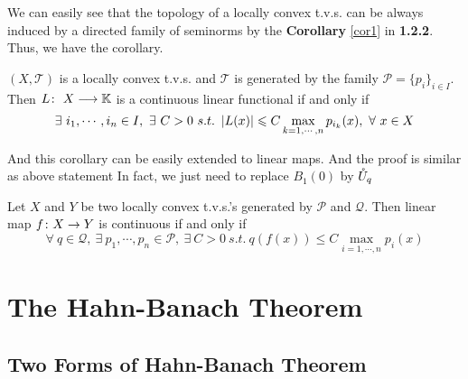 \documentclass[a4paper,11pt]{report}
\begin{document}
We can easily see that the topology of a locally convex t.v.s. can be always induced by a directed family of seminorms by the \textbf{Corollary} \ref{cor1} in \textbf{1.2.2}. Thus, we have the corollary.

\begin{cor} \label{cor3}
	$(X,\mathscr{T})$ is a locally convex t.v.s. and $\mathscr{T}$ is generated by the family $\mathscr{P} = \{p_i\}_{i \in I}$. Then $L \colon ~ X \longrightarrow \mathbb{K}$ is a continuous linear functional if and only if 
	\begin{equation*}
		\exists ~ i_1,\cdots,i_n \in I,~ \exists ~ C>0 ~s.t.~ \left\lvert L(x)\right\lvert \leqslant C \max_{k=1,\cdots,n} p_{i_k}(x),~ \forall ~ x \in X
	\end{equation*}
\end{cor}

And this corollary can be easily extended to linear maps. And the proof is similar as above statement In fact, we just need to replace $B_1(0)$ by $\mathring{U}_q$
\begin{thm} \label{thm2}
	Let $X$ and $Y$ be two locally convex t.v.s.'s generated by $\mathscr{P}$ and $\mathscr{Q}$. Then linear map $f \colon X \rightarrow Y$ is continuous if and only if 
	\begin{equation*}
		\forall ~ q \in \mathscr{Q},~ \exists ~ p_1,\cdots,p_n \in \mathscr{P},~ \exists ~ C>0 ~s.t.~ q(f(x)) \leqslant C \max_{i=1,\cdots,n} p_i(x)
	\end{equation*}
\end{thm}

\section{The Hahn-Banach Theorem}

\subsection{Two Forms of Hahn-Banach Theorem}
\end{document}
